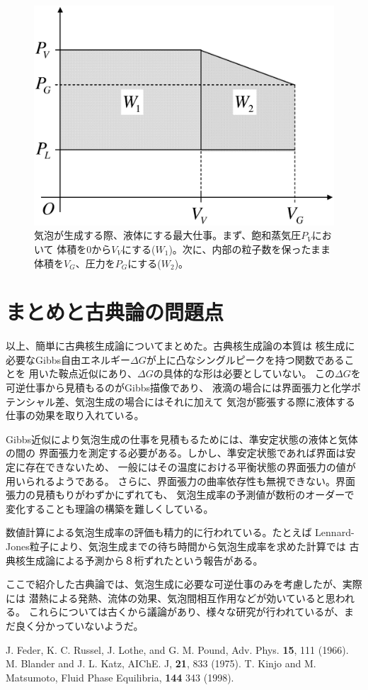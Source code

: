 \documentclass{jarticle}
\begin{document}
\begin{figure}[htbp]
    \begin{center}
        \includegraphics[width=0.5\linewidth]{pv.eps}
    \end{center}
    \caption{
        気泡が生成する際、液体にする最大仕事。まず、飽和蒸気圧$P_V$において
        体積を$0$から$V_V$にする($W_1$)。次に、内部の粒子数を保ったまま
        体積を$V_G$、圧力を$P_G$にする($W_2$)。
    }
    \label{fig_pv}
\end{figure}


\section{まとめと古典論の問題点}

以上、簡単に古典核生成論についてまとめた。古典核生成論の本質は
核生成に必要なGibbs自由エネルギー$\Delta G$が上に凸なシングルピークを持つ関数であることを
用いた鞍点近似にあり、$\Delta G$の具体的な形は必要としていない。
この$\Delta G$を可逆仕事から見積もるのがGibbs描像であり、
液滴の場合には界面張力と化学ポテンシャル差、気泡生成の場合にはそれに加えて
気泡が膨張する際に液体する仕事の効果を取り入れている。

Gibbs近似により気泡生成の仕事を見積もるためには、準安定状態の液体と気体の間の
界面張力を測定する必要がある。しかし、準安定状態であれば界面は安定に存在できないため、
一般にはその温度における平衡状態の界面張力の値が用いられるようである。
さらに、界面張力の曲率依存性も無視できない。界面張力の見積もりがわずかにずれても、
気泡生成率の予測値が数桁のオーダーで変化することも理論の構築を難しくしている。

数値計算による気泡生成率の評価も精力的に行われている。たとえば
Lennard-Jones粒子により、気泡生成までの待ち時間から気泡生成率を求めた計算では
古典核生成論による予測から８桁ずれたという報告がある\cite{Kinjo}。

ここで紹介した古典論では、気泡生成に必要な可逆仕事のみを考慮したが、実際には
潜熱による発熱、流体の効果、気泡間相互作用などが効いていると思われる。
これらについては古くから議論があり、様々な研究が行われているが、まだ良く分かっていないようだ。


\begin{thebibliography}{9}
     J. Feder, K. C. Russel, J. Lothe, and G. M. Pound, Adv. Phys. {\bf 15}, 111 (1966).
     M. Blander and J. L. Katz, AIChE. J, \textbf{21}, 833 (1975).
     T. Kinjo and M. Matsumoto, Fluid Phase Equilibria, \textbf{144} 343 (1998).
\end{thebibliography}
\end{document}
